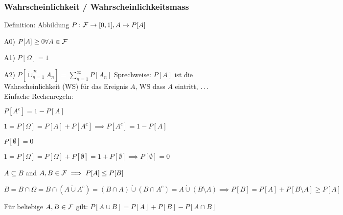 \subsubsection{Wahrscheinlichkeit / Wahrscheinlichkeitsmass}
Definition: Abbildung $P: \mathcal{F} \rightarrow [0,1], A \mapsto P[A]$
\enumstart
	\item A0) $P[A] \ge 0 \forall A \in \mathcal{F}$
	\item A1) $P[\Omega] = 1$
	\item A2) $P[\dot\cup_{n = 1}^{\infty}A_n] = \sum_{n = 1}^{\infty}P[A_n]$
\enumend
Sprechweise: $P[A]$ ist die Wahrscheinlichkeit (WS) für das Ereignis $A$, WS dass $A$ eintritt, $\mathellipsis$\\
Einfache Rechenregeln:
\enumstart
	\item $P[A^c] = 1 - P[A]$
	\enumstart
		\item $1 = P[\Omega] = P[A] + P[A^c] \implies P[A^c] = 1 - P[A]$
	\enumend
	\item $P[\emptyset] = 0$
	\enumstart
		\item $1 = P[\Omega] = P[\Omega] + P[\emptyset] = 1 + P[\emptyset]\implies P[\emptyset] = 0$
	\enumend
	\item $A \subseteq B$ and $A,B \in \mathcal{F} \implies P[A] \le P[B]$
	\enumstart
		\item $B = B \cap \Omega = B \cap (A \dot\cup A^c) = (B \cap A) \dot\cup (B \cap A^c) = A \dot\cup (B \setminus A) \implies P[B] = P[A] + P[B \setminus A] \ge P[A]$
	\enumend
	\item Für beliebige $A,B \in \mathcal{F}$ gilt: $P[A \cup B] = P[A] + P[B] - P[A \cap B]$
\enumend